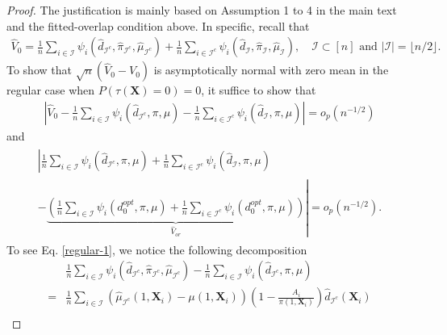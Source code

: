\documentclass[11pt]{article}
\theoremstyle{referenceplain}
\theoremstyle{referencedefinition}
\theoremstyle{referenceremark}
\begin{document}
\begin{proof}
The justification is mainly based on Assumption 1 to 4 in the main text {and the fitted-overlap condition above}. In specific, recall that
    \begin{align*}
          \widehat{V}_0=\frac{1}{n}\sum_{i\in\mathcal{I}} \psi_i\left(\widehat{d}_{\mathcal{I}^c}, \widehat{\pi}_{\mathcal{I}^c}, \widehat{\mu}_{\mathcal{I}^c}\right)+\frac{1}{n}\sum_{i\in\mathcal{I}^c} \psi_i\left(\widehat{d}_{\mathcal{I}}, \widehat{\pi}_{\mathcal{I}}, \widehat{\mu}_{\mathcal{I}}\right),\quad \mathcal{I}\subset[n] \text{ and } |\mathcal{I}|=\lfloor n/2\rfloor.
    \end{align*}
    To show that $\sqrt{n}(\widehat{V}_0-V_0)$ is asymptotically normal with zero mean in the regular case when $P(\tau(\mathbf{X})=0)=0$, it suffice to show that
    \begin{align}\label{regular-1}
        \left|\widehat{V}_0 - \frac{1}{n}\sum_{i\in\mathcal{I}} \psi_i\left(\widehat{d}_{\mathcal{I}^c}, \pi, \mu\right)-\frac{1}{n}\sum_{i\in\mathcal{I}^c} \psi_i\left(\widehat{d}_{\mathcal{I}}, \pi, \mu\right)\right|=o_p(n^{-1/2})
    \end{align}
    and
    \begin{align}\label{regular-2}
    \begin{aligned}
          \left|\frac{1}{n}\sum_{i\in\mathcal{I}} \psi_i\left(\widehat{d}_{\mathcal{I}^c}, \pi, \mu\right)+\frac{1}{n}\sum_{i\in\mathcal{I}^c} \psi_i\left(\widehat{d}_{\mathcal{I}}, \pi, \mu\right)\right.\\
        \left.-\underbrace{\left(\frac{1}{n}\sum_{i\in\mathcal{I}} \psi_i\left(d_0^{opt}, \pi, \mu\right)+\frac{1}{n}\sum_{i\in\mathcal{I}^c} \psi_i\left(d_0^{opt}, \pi, \mu\right)\right)}_{\widehat{V}_{or}}\right|=o_p(n^{-1/2}).
    \end{aligned}
    \end{align}
    To see Eq. \eqref{regular-1}, we notice the following decomposition
    \begin{align}
        &\frac{1}{n}\sum_{i\in\mathcal{I}} \psi_i\left(\widehat{d}_{\mathcal{I}^c}, \widehat{\pi}_{\mathcal{I}^c}, \widehat{\mu}_{\mathcal{I}^c}\right) - \frac{1}{n}\sum_{i\in\mathcal{I}} \psi_i\left(\widehat{d}_{\mathcal{I}^c}, \pi, \mu\right)\label{regular-1.0}\\
        =&\frac{1}{n}\sum_{i\in\mathcal{I}}\left(\widehat{\mu}_{\mathcal{I}^c}(1,\mathbf{X}_i)-\mu(1,\mathbf{X}_i)\right)\left(1-\frac{A_i}{\pi(1,\mathbf{X}_i)}\right)\widehat{d}_{\mathcal{I}^c}(\mathbf{X}_i)\label{regular-1.1}\\

\end{align}
\end{proof}
\end{document}
